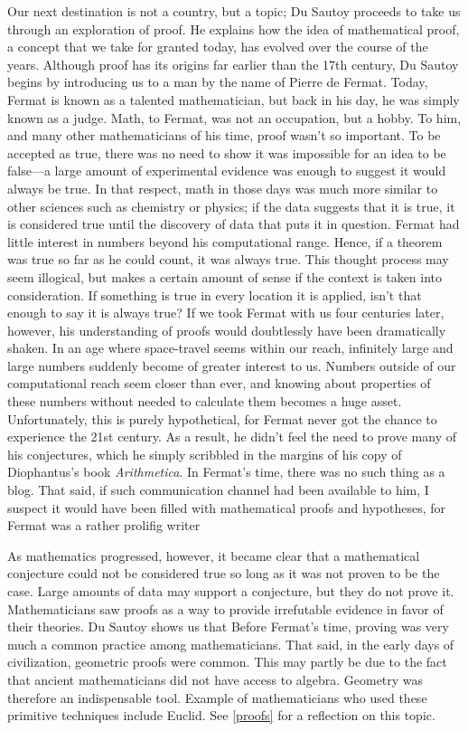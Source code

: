 \documentclass{mathbook}
\begin{document}
    Our next destination is not a country, but a topic; Du Sautoy proceeds to take us through an exploration of proof. He explains how the idea of mathematical proof, a concept that we take for granted today, has evolved over the course of the years. Although proof has its origins far earlier than the 17th century, Du Sautoy begins by introducing us to a man by the name of Pierre de Fermat. Today, Fermat is known as a talented mathematician, but back in his day, he was simply known as a judge. Math, to Fermat, was not an occupation, but a hobby. To him, and many other mathematicians of his time, proof wasn't so important. To be accepted as true, there was no need to show it was impossible for an idea to be false––a large amount of experimental evidence was enough to suggest it would always be true. In that respect, math in those days was much more similar to other sciences such as chemistry or physics; if the data suggests that it is true, it is considered true until the discovery of data that puts it in question. Fermat had little interest in numbers beyond his computational range. Hence, if a theorem was true so far as he could count, it was always true. This thought process may seem illogical, but makes a certain amount of sense if the context is taken into consideration. If something is true in every location it is applied, isn't that enough to say it is always true? If we took Fermat with us four centuries later, however, his understanding of proofs would doubtlessly have been dramatically shaken. In an age where space-travel seems within our reach, infinitely large and large numbers suddenly become of greater interest to us. Numbers outside of our computational reach seem closer than ever, and knowing about properties of these numbers without needed to calculate them becomes a huge asset. Unfortunately, this is purely hypothetical, for Fermat never got the chance to experience the 21st century. As a result, he didn't feel the need to prove many of his conjectures, which he simply scribbled in the margins of his copy of Diophantus's book \emph{Arithmetica}. In Fermat's time, there was no such thing as a blog. That said, if such communication channel had been available to him, I suspect it would have been filled with mathematical proofs and hypotheses, for Fermat was a rather prolifig writer 
    
    As mathematics progressed, however, it became clear that a mathematical conjecture could not be considered true so long as it was not proven to be the case. Large amounts of data may support a conjecture, but they do not prove it. Mathematicians saw proofs as a way to provide irrefutable evidence in favor of their theories. Du Sautoy shows us that Before Fermat's time, proving was very much a common practice among mathematicians. That said, in the early days of civilization, geometric proofs were common. This may partly be due to the fact that ancient mathematicians did not have access to algebra. Geometry was therefore an indispensable tool. Example of mathematicians who used these primitive techniques include Euclid. See \ref{proofs} for a reflection on this topic.
\end{document}
